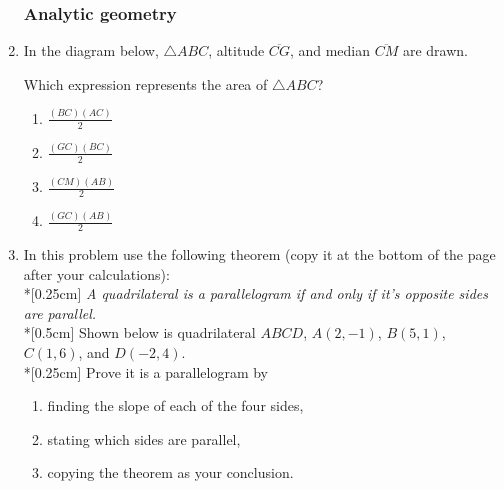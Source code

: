 \documentclass[12pt, oneside]{article}
\begin{document}
\begin{enumerate}[itemsep=0cm]
\newpage
\subsubsection*{Analytic geometry}
\item In the diagram below, $\triangle ABC$, altitude $\overline{CG}$, and median $\overline{CM}$ are drawn.
\begin{center}
\end{center}
Which expression represents the area of $\triangle ABC$?
  \begin{multicols}{2}
  \begin{enumerate}
    \item $\displaystyle \frac{(BC)(AC)}{2}$
    \item $\displaystyle \frac{(GC)(BC)}{2}$
    \item $\displaystyle \frac{(CM)(AB)}{2}$
    \item $\displaystyle \frac{(GC)(AB)}{2}$
  \end{enumerate}
  \end{multicols}
  
\item In this problem use the following theorem (copy it at the bottom of the page after your calculations): \\*[0.25cm]
    \emph{A quadrilateral is a parallelogram if and only if it's opposite sides are parallel.}\\*[0.5cm]
    Shown below is quadrilateral $ABCD$, $A(2,-1)$, $B(5,1)$, $C(1,6)$, and $D(-2,4)$. \\*[0.25cm]
    Prove it is a parallelogram by
    \begin{enumerate}
      \item finding the slope of each of the four sides,
      \item stating which sides are parallel,
      \item copying the theorem as your conclusion.
    \end{enumerate}
    \begin{flushright} %
    \end{flushright}


\end{enumerate}
\end{document}
